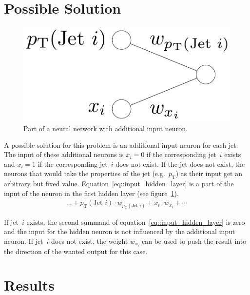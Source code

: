 \documentclass[12pt,a4paper]{article}
\begin{document}
\section{Possible Solution}
\label{sec::Possible_solution}

\begin{figure}
\begin{center}
\includegraphics[scale=0.4]{NN_picture_2.pdf}
\caption{Part of a neural network with additional input neuron.}
\label{fig::NN_picture_2}
\end{center}
\end{figure}

A possible solution for this problem is an additional input neuron for each jet. The input of these additional neurons is $x_i = 0$ if the corresponding jet~$i$ exists and $x_i = 1$ if the corresponding jet~$i$ does not exist. If the jet does not exist, the neurons that would take the properties of the jet (e.g.\ $p_\text{T}$) as their input get an arbitrary but fixed value. Equation~\eqref{eq::input_hidden_layer} is a part of the input of the neuron in the first hidden layer (see figure~\ref{fig::NN_picture_2}).
\begin{align}
\dots + p_\text{T}(\text{Jet }i) \cdot w_{p_\text{T}(\text{Jet }i)} + x_i \cdot w_{x_i} + \dotsb \label{eq::input_hidden_layer}
\end{align}

If jet~$i$ exists, the second summand of equation~\eqref{eq::input_hidden_layer} is zero and the input for the hidden neuron is not influenced by the additional input neuron. If jet~$i$ does not exist, the weight $w_{x_i}$ can be used to push the result into the direction of the wanted output for this case.


\section{Results}
\end{document}

